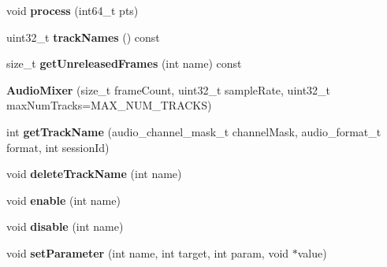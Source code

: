 \begin{DoxyCompactItemize}
void {\bfseries process} (int64\+\_\+t pts)
\item 
\mbox{\label{classcocos2d_1_1experimental_1_1AudioMixer_af43b486f4c8cc4356e95df6363471295}} 
uint32\+\_\+t {\bfseries track\+Names} () const
\item 
\mbox{\label{classcocos2d_1_1experimental_1_1AudioMixer_ab24d91b2c4bab5e658e4746840c159d1}} 
size\+\_\+t {\bfseries get\+Unreleased\+Frames} (int name) const
\item 
\mbox{\label{classcocos2d_1_1experimental_1_1AudioMixer_a63e35a29bf6e19b262c622c655aa114f}} 
{\bfseries Audio\+Mixer} (size\+\_\+t frame\+Count, uint32\+\_\+t sample\+Rate, uint32\+\_\+t max\+Num\+Tracks=M\+A\+X\+\_\+\+N\+U\+M\+\_\+\+T\+R\+A\+C\+KS)
\item 
\mbox{\label{classcocos2d_1_1experimental_1_1AudioMixer_ac364aeeaa14ba494e5b257332ff4ef63}} 
int {\bfseries get\+Track\+Name} (audio\+\_\+channel\+\_\+mask\+\_\+t channel\+Mask, audio\+\_\+format\+\_\+t format, int session\+Id)
\item 
\mbox{\label{classcocos2d_1_1experimental_1_1AudioMixer_a2d7d78fbee19e7430c00f08eba19251b}} 
void {\bfseries delete\+Track\+Name} (int name)
\item 
\mbox{\label{classcocos2d_1_1experimental_1_1AudioMixer_a2bc1a3464f19a01dc2557dfedd2a6607}} 
void {\bfseries enable} (int name)
\item 
\mbox{\label{classcocos2d_1_1experimental_1_1AudioMixer_a916ecb0f49474c9ab83c9a1185025e48}} 
void {\bfseries disable} (int name)
\item 
\mbox{\label{classcocos2d_1_1experimental_1_1AudioMixer_a952176a2d624378f2f5b5b6d46ef0089}} 
void {\bfseries set\+Parameter} (int name, int target, int param, void $\ast$value)
\item 
\mbox{\label{classcocos2d_1_1experimental_1_1AudioMixer_a89e2c733426ac9d4d4cbf4d213339f7d}} 

\end{DoxyCompactItemize}
